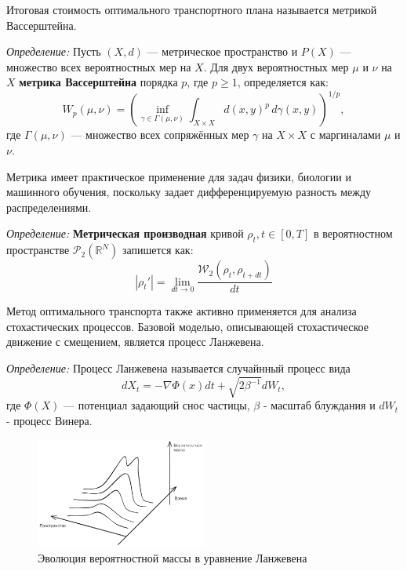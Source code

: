 Итоговая стоимость оптимального транспортного плана называется метрикой Вассерштейна.

\textit{Определение:} Пусть \((X, d)\) --- метрическое пространство и \(P(X)\) --- множество всех вероятностных мер на \(X\). 
Для двух вероятностных мер \(\mu\) и \(\nu\) на \(X\) \textbf{метрика Вассерштейна} порядка \(p\), где \(p \geq 1\), определяется как:
\begin{equation}
    W_p(\mu, \nu) = \left( \inf_{\gamma \in \Gamma(\mu, \nu)} \int_{X \times X} d(x, y)^p \, d\gamma(x, y) \right)^{1/p},
\end{equation}
где \(\Gamma(\mu, \nu)\) — множество всех сопряжённых мер \(\gamma\) на \(X \times X\) с маргиналами \(\mu\) и \(\nu\).

Метрика имеет практическое применение для задач физики, биологии и машинного обучения, поскольку задает 
дифференцируемую разность между распределениями.

\textit{Определение:} \textbf{Метрическая производная} кривой $\rho_t,t \in [0,T]$ в вероятностном 
пространстве $\mathcal{P}_2(\mathbb{R}^N)$ запишется как:
\begin{equation}
    |\rho_t'| = \lim_{dt \rightarrow 0} \frac{\mathcal{W}_2(\rho_t, \rho_{t+dt})}{dt}
\end{equation}

Метод оптимального транспорта также активно применяется для анализа стохастических процессов. Базовой моделью, 
описывающей стохастическое движение с смещением, является процесс Ланжевена.

\textit{Определение:} Процесс Ланжевена называется случайнный процесс вида
\begin{equation}
    d X_t = - \nabla \Phi(x) dt + \sqrt{2 \beta^{-1}} d W_t,
\end{equation}
где $\Phi(X)$ --- потенциал задающий снос частицы, $\beta$ - масштаб блуждания и  $d W_t$ - процесс Винера.

\begin{figure}[h]
    \centering
    \includegraphics[width=0.5\textwidth]{assets/math/transport/fokker-plank.excalidraw.png}
    \caption{Эволюция вероятностной массы в уравнение Ланжевена}
    \label{opt_transport}
\end{figure}

